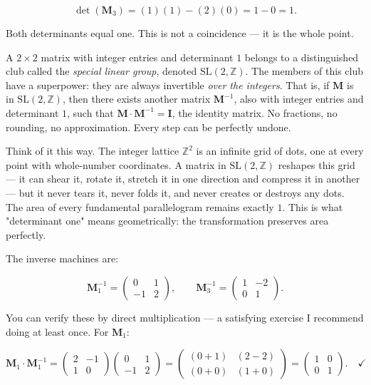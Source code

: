 \documentclass[12pt, letterpaper, openany]{book}
\theoremstyle{definition}
\theoremstyle{remark}
\begin{document}
\[
\det(\mathbf{M}_3) = (1)(1) - (2)(0) = 1 - 0 = 1.
\]

Both determinants equal one. This is not a coincidence --- it is the whole point.

A $2 \times 2$ matrix with integer entries and determinant $1$ belongs to a distinguished club called the \textit{special linear group}, denoted $\mathrm{SL}(2, \mathbb{Z})$. The members of this club have a superpower: they are always invertible \textit{over the integers}. That is, if $\mathbf{M}$ is in $\mathrm{SL}(2, \mathbb{Z})$, then there exists another matrix $\mathbf{M}^{-1}$, also with integer entries and determinant $1$, such that $\mathbf{M} \cdot \mathbf{M}^{-1} = \mathbf{I}$, the identity matrix. No fractions, no rounding, no approximation. Every step can be perfectly undone.

Think of it this way. The integer lattice $\mathbb{Z}^2$ is an infinite grid of dots, one at every point with whole-number coordinates. A matrix in $\mathrm{SL}(2, \mathbb{Z})$ reshapes this grid --- it can shear it, rotate it, stretch it in one direction and compress it in another --- but it never tears it, never folds it, and never creates or destroys any dots. The area of every fundamental parallelogram remains exactly $1$. This is what "determinant one" means geometrically: the transformation preserves area perfectly.

The inverse machines are:

\[
\mathbf{M}_1^{-1} = \begin{pmatrix} 0 & 1 \\ -1 & 2 \end{pmatrix}, \qquad
\mathbf{M}_3^{-1} = \begin{pmatrix} 1 & -2 \\ 0 & 1 \end{pmatrix}.
\]

You can verify these by direct multiplication --- a satisfying exercise I recommend doing at least once. For $\mathbf{M}_1$:

\[
\mathbf{M}_1 \cdot \mathbf{M}_1^{-1} = \begin{pmatrix} 2 & -1 \\ 1 & 0 \end{pmatrix} \begin{pmatrix} 0 & 1 \\ -1 & 2 \end{pmatrix} = \begin{pmatrix} (0+1) & (2-2) \\ (0+0) & (1+0) \end{pmatrix} = \begin{pmatrix} 1 & 0 \\ 0 & 1 \end{pmatrix}. \quad \checkmark
\]
\end{document}
